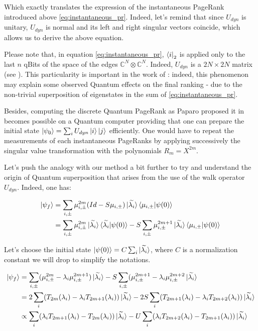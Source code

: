 \documentclass[sn-mathphys]{sn-jnl}%
\theoremstyle{thmstyleone}%
\theoremstyle{thmstyletwo}%
\theoremstyle{thmstylethree}%
\begin{document}
Which exactly translates the expression of the instantaneous PageRank introduced above \ref{eq:instantaneous_pr}. Indeed, let's remind that since $U_{dyn}$ is unitary, $U_{dyn}$ is normal and its left and right singular vectors coincide, which allows us to derive the above equation.

Please note that, in equation \ref{eq:instantaneous_pr}, $\bra{i}_2$ is applied only to the last $n$ qBits of the space of the edges $\mathbb{C}^N \otimes \mathbb{C}^N$. Indeed, $U_{dyn}$ is a $2N \times 2N$ matrix (see \cite{paparo_martin-delgado_2012}). This particularity is important in the work of \cite{paparo_martin-delgado_2012}: indeed, this phenomenon may explain some observed Quantum effects on the final ranking - due to the non-trivial superposition of eigenstates in the sum of \ref{eq:instantaneous_pr}.

Besides, computing the discrete Quantum PageRank as Paparo proposed it in \cite{paparo_martin-delgado_2012} becomes possible on a Quantum computer providing that one can prepare the initial state $\ket{\psi_0} = \sum_i U_{dyn} \ket{i}\ket{j}$ efficiently. One would have to repeat the measurements of each instantaneous PageRanks by applying successively the singular value transformation with the polynomials $R_m = X^{2m}$.

Let's push the analogy with our method a bit further to try and understand the origin of Quantum superposition that arises from the use of the walk operator $U_{dyn}$. Indeed, one has:

\begin{align}
    \ket{\psi_f} &= \sum_{i, \pm} \mu_{i, \pm}^{2m}(Id - S \mu_{i, \pm}) \ket{\widetilde{\lambda_i}} \braket{\mu_{i, \pm}| \psi(0)} \\
    &= \sum_{i, \pm} \mu_{i, \pm}^{2m} \ket{\widetilde{\lambda_i}} \braket{\widetilde{\lambda_i}| \psi(0)} - S \sum_{i, \pm} \mu_{i, \pm}^{2m+1} \ket{\widetilde{\lambda_i}} \braket{\mu_{i, \pm} |\psi(0)}
\end{align}

Let's choose the initial state $\ket{\psi(0)} = C \sum_{i} \ket{\widetilde{\lambda_i}}$, where $C$ is a normalization constant we will drop to simplify the notations.

\begin{align}
    \ket{\psi_f} &= \sum_{i, \pm}(\mu_{i,\pm}^{2m} - \lambda_i \mu_{i, \pm}^{2m+1}) \ket{\widetilde{\lambda_i}} - S \sum_{i, \pm} (\mu_{i, \pm}^{2m+1} - \lambda_i \mu_{i, \pm}^{2m+2} \ket{\widetilde{\lambda_i}} \\
    &= 2\sum_i (T_{2m}(\lambda_i) - \lambda_i T_{2m+1}(\lambda_i)) \ket{\widetilde{\lambda_i}} - 2 S \sum_i (T_{2m+1} (\lambda_i) - \lambda_i T_{2m+2}(\lambda_i)) \ket{\widetilde{\lambda_i}} \\
    &\propto \sum_i ( \lambda_i T_{2m+1}(\lambda_i) - T_{2m}(\lambda_i)) \ket{\widetilde{\lambda_i}} - U \sum_i (\lambda_i T_{2m+2}(\lambda_i) - T_{2m+1} (\lambda_i)) \ket{\widetilde{\lambda_i}}  \label{eq:final_state_paparo}
\end{align}
\end{document}
